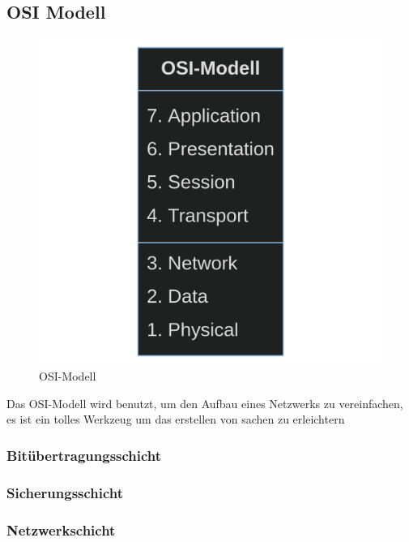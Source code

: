 \documentclass[12pt]{article}
\begin{document}
\subsection{OSI Modell}


\begin{figure}
	\centering
	\includegraphics[scale=0.1]{Bilder/OSI-Modell}
	\caption{OSI-Modell}
	\label{fig:figure3}
	
\end{figure}



Das OSI-Modell wird benutzt, um den Aufbau eines Netzwerks zu vereinfachen, es ist ein tolles Werkzeug um das erstellen von sachen zu erleichtern



	
\subsubsection{Bitübertragungsschicht}
\subsubsection{Sicherungsschicht}
\subsubsection{Netzwerkschicht}
\end{document}
